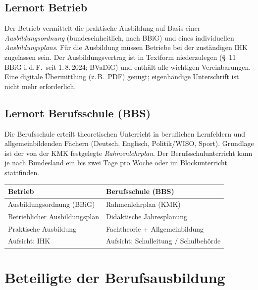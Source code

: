 \documentclass[11pt, a4paper]{article}
\begin{document}
\subsection{Lernort Betrieb}

Der Betrieb vermittelt die praktische Ausbildung auf Basis einer \emph{Ausbildungsordnung}
(bundeseinheitlich, nach BBiG) und eines individuellen \emph{Ausbildungsplans}. Für die
Ausbildung müssen Betriebe bei der zuständigen IHK zugelassen sein. Der Ausbildungsvertrag
ist in Textform niederzulegen (§~11 BBiG i.\,d.\,F.\ seit 1.\,8.\,2024; BVaDiG) und enthält alle wichtigen Vereinbarungen. Eine digitale Übermittlung (z.\,B.\ PDF) genügt; eigenhändige Unterschrift ist nicht mehr erforderlich.

\subsection{Lernort Berufsschule (BBS)}

Die Berufsschule erteilt theoretischen Unterricht in beruflichen Lernfeldern und
allgemeinbildenden Fächern (Deutsch, Englisch, Politik/WISO, Sport). Grundlage ist der von
der KMK festgelegte \emph{Rahmenlehrplan}. Der Berufsschulunterricht kann je nach
Bundesland ein bis zwei Tage pro Woche oder im Blockunterricht stattfinden.

\begin{center}
\begin{tabular}{p{6.5cm} p{6.5cm}}
\toprule
\textbf{Betrieb} & \textbf{Berufsschule (BBS)}\\
\midrule
Ausbildungsordnung (BBiG) & Rahmenlehrplan (KMK)\\
Betrieblicher Ausbildungsplan & Didaktische Jahresplanung\\
Praktische Ausbildung & Fachtheorie + Allgemeinbildung\\
Aufsicht: IHK & Aufsicht: Schulleitung / Schulbehörde\\
\bottomrule
\end{tabular}
\end{center}

\section{Beteiligte der Berufsausbildung}
\end{document}
